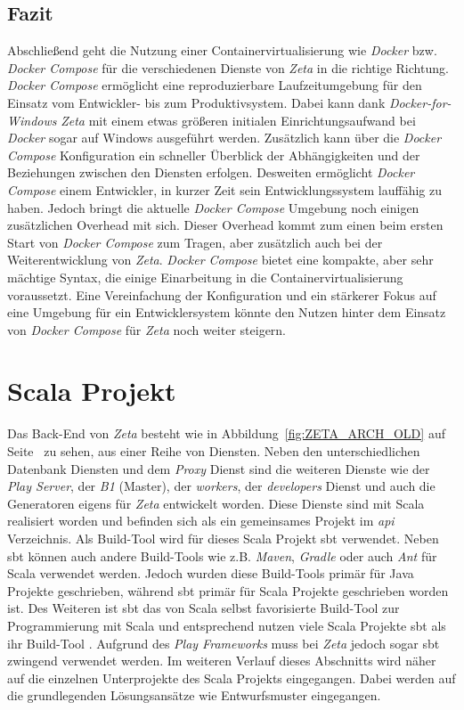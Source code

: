 \subsection{Fazit}

Abschließend geht die Nutzung einer Containervirtualisierung wie \textit{Docker} bzw. \textit{Docker Compose} für die verschiedenen Dienste von \textit{Zeta} in die richtige Richtung. \textit{Docker Compose} ermöglicht eine reproduzierbare Laufzeitumgebung für den Einsatz vom Entwickler- bis zum Produktivsystem. Dabei kann dank \textit{Docker-for-Windows} \textit{Zeta} mit einem etwas größeren initialen Einrichtungsaufwand bei \textit{Docker} sogar auf Windows ausgeführt werden. Zusätzlich kann über die \textit{Docker Compose} Konfiguration ein schneller Überblick der Abhängigkeiten und der Beziehungen zwischen den Diensten erfolgen. Desweiten ermöglicht \textit{Docker Compose} einem Entwickler, in kurzer Zeit sein Entwicklungssystem lauffähig zu haben. Jedoch bringt die aktuelle \textit{Docker Compose} Umgebung noch einigen zusätzlichen Overhead mit sich. Dieser Overhead kommt zum einen beim ersten Start von \textit{Docker Compose} zum Tragen, aber zusätzlich auch bei der Weiterentwicklung von \textit{Zeta}. \textit{Docker Compose} bietet eine kompakte, aber sehr mächtige Syntax, die einige Einarbeitung in die Containervirtualisierung voraussetzt. Eine Vereinfachung der Konfiguration und ein stärkerer Fokus auf eine Umgebung für ein Entwicklersystem könnte den Nutzen hinter dem Einsatz von \textit{Docker Compose} für \textit{Zeta} noch weiter steigern.

\section {Scala Projekt}

Das Back-End von \textit{Zeta} besteht wie in Abbildung~\ref{fig:ZETA_ARCH_OLD} auf Seite~\pageref{fig:ZETA_ARCH_OLD} zu sehen, aus einer Reihe von Diensten. Neben den unterschiedlichen Datenbank Diensten und dem \textit{Proxy} Dienst sind die weiteren Dienste wie der \textit{Play Server}, der \textit{B1} (Master), der \textit{workers}, der \textit{developers} Dienst und auch die Generatoren eigens für \textit{Zeta} entwickelt worden. Diese Dienste sind mit Scala realisiert worden und befinden sich als ein gemeinsames Projekt im \textit{api} Verzeichnis. Als Build-Tool wird für dieses Scala Projekt \ac{sbt} verwendet. Neben \ac{sbt} können auch andere Build-Tools wie z.B. \textit{Maven}, \textit{Gradle} oder auch \textit{Ant} für Scala verwendet werden. Jedoch wurden diese Build-Tools primär für Java Projekte geschrieben, während \ac{sbt} primär für Scala Projekte geschrieben worden ist. Des Weiteren ist \ac{sbt} das von Scala selbst favorisierte Build-Tool zur Programmierung mit Scala und entsprechend nutzen viele Scala Projekte \ac{sbt} als ihr Build-Tool \cite{scala_getting_started}. Aufgrund des \textit{Play Frameworks} muss bei \textit{Zeta} jedoch sogar \ac{sbt} zwingend verwendet werden. Im weiteren Verlauf dieses Abschnitts wird näher auf die einzelnen Unterprojekte des Scala Projekts eingegangen. Dabei werden auf die grundlegenden Lösungsansätze wie Entwurfsmuster eingegangen.

